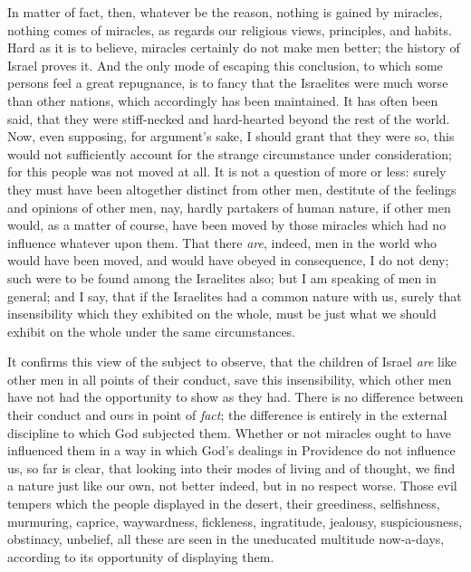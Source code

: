 In matter of fact, then, whatever be the reason, nothing is gained
by miracles, nothing comes of miracles, as regards our religious
views, principles, and habits. Hard as it is to believe, miracles
certainly do not make men better; the history of Israel proves it. And
the only mode of escaping this conclusion, to which some persons feel
a great repugnance, is to fancy that the Israelites were much worse
than other nations, which accordingly has been maintained. It has
often been said, that they were stiff-necked and hard-hearted beyond
the rest of the world. Now, even supposing, for argument's sake, I
should grant that they were so, this would not sufficiently account
for the strange circumstance under consideration; for this people was
not moved at all. It is not a question of more or less: surely they
must have been altogether distinct from other men, destitute of the
feelings and opinions of other men, nay, hardly partakers of human
nature, if other men would, as a matter of course, have been moved by
those miracles which had no influence whatever upon them. That there \emph{are},
indeed, men in the world who would have been moved, and would have
obeyed in consequence, I do not deny; such were to be found among the
Israelites also; but I am speaking of men in general; and I say, that
if the Israelites had a common nature with us, surely that
insensibility which they exhibited on the whole, must be just what we
should exhibit on the whole under the same circumstances.

It confirms this view of the subject to observe, that the children
of Israel \emph{are} like other men in all points of their conduct,
save this insensibility, which other men have not had the opportunity
to show as they had. There is no difference between their conduct and
ours in point of \emph{fact}; the difference is entirely in the
external discipline to which God subjected them. Whether or not
miracles ought to have influenced them in a way in which God's
dealings in Providence do not influence us, so far is clear, that
looking into their modes of living and of thought, we find a nature
just like our own, not better indeed, but in no respect worse. Those
evil tempers which the people displayed in the desert, their
greediness, selfishness, murmuring, caprice, waywardness, fickleness,
ingratitude, jealousy, suspiciousness, obstinacy, unbelief, all these
are seen in the uneducated multitude now-a-days, according to its
opportunity of displaying them.

